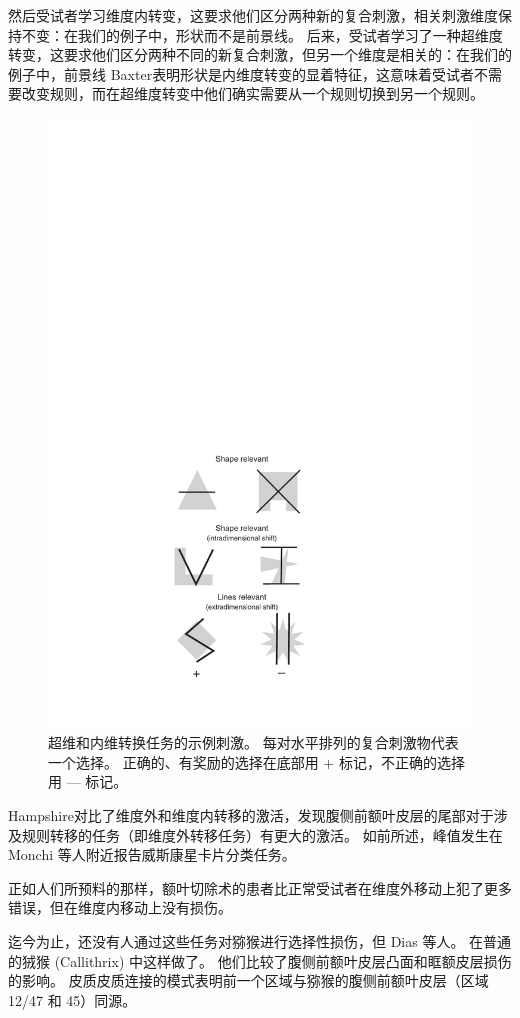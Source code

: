 然后受试者学习维度内转变，这要求他们区分两种新的复合刺激，相关刺激维度保持不变：在我们的例子中，形状而不是前景线。 
后来，受试者学习了一种超维度转变，这要求他们区分两种不同的新复合刺激，但另一个维度是相关的：在我们的例子中，前景线 Baxter\cite{baxter2007orbital}表明形状是内维度转变的显着特征，这意味着受试者不需要改变规则，而在超维度转变中他们确实需要从一个规则切换到另一个规则。


  \begin{figure}
  	\centering
  	\includegraphics[width=0.6\linewidth]{chap7/7_10}
  	\caption{超维和内维转换任务的示例刺激。 
  		每对水平排列的复合刺激物代表一个选择。 
  		正确的、有奖励的选择在底部用 + 标记，不正确的选择用 — 标记\cite{dias1996primate}。\label{fig:7_10}}
  \end{figure}
\par


Hampshire\cite{hampshire2006fractionating}对比了维度外和维度内转移的激活，发现腹侧前额叶皮层的尾部对于涉及规则转移的任务（即维度外转移任务）有更大的激活。 
如前所述，峰值发生在 Monchi 等人附近\cite{monchi2001wisconsin}报告威斯康星卡片分类任务。
\par


正如人们所预料的那样，额叶切除术的患者比正常受试者在维度外移动上犯了更多错误，但在维度内移动上没有损伤\cite{owen1993contrasting}。
\par


迄今为止，还没有人通过这些任务对猕猴进行选择性损伤，但 Dias 等人。
\cite{dias1997dissociable}在普通的狨猴 (Callithrix) 中这样做了。 
他们比较了腹侧前额叶皮层凸面和眶额皮层损伤的影响。 
皮质皮质连接的模式表明前一个区域与猕猴的腹侧前额叶皮层（区域 12/47 和 45）同源\cite{roberts2007forebrain}。
\par


